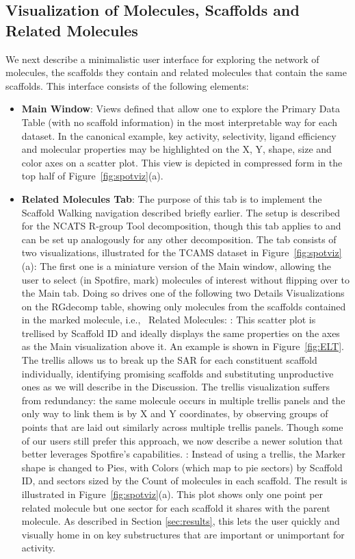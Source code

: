 \documentclass[journal=jacsat,manuscript=article]{achemso}
\newcommand*\fref[1]{Figure~\ref{fig:#1}}
\newcommand*\ie{i.e.,~}
\begin{document}
\subsection{Visualization of Molecules, Scaffolds and Related Molecules}

We next describe a minimalistic user interface for exploring the
network of molecules, the scaffolds they contain and related molecules
that contain the same scaffolds. This interface consists of the
following elements:
\begin{itemize}
\item {\bf Main Window}: Views defined that allow one to explore the
  Primary Data Table (with no scaffold information) in the most interpretable
  way for each dataset.  In the canonical example, key activity,
  selectivity, ligand efficiency and molecular properties may be
  highlighted on the X, Y, shape, size and color axes on a scatter  plot.
  This view is depicted in compressed form in the top half of \fref{spotviz}(a).
\item {\bf Related Molecules Tab}: The purpose of this tab is to
  implement the Scaffold Walking navigation described briefly earlier.
  The setup is described for the NCATS R-group Tool decomposition,
  though this tab applies to and can be set up analogously for any
  other decomposition. The tab consists of two visualizations,
  illustrated for the TCAMS dataset in \fref{spotviz}(a): \subitem The
  first one is a miniature version of the Main window, allowing the
  user to select (in Spotfire, mark) molecules of interest without
  flipping over to the Main tab. Doing so drives one of the following
  two Details Visualizations on the {RG}decomp table, showing only
  molecules from the scaffolds contained in the marked molecule, \ie
  Related Molecules: : This scatter
  plot is trellised by Scaffold ID and ideally displays the same
  properties on the axes as the Main visualization above it.  An
  example is shown in \fref{ELT}. The trellis allows us to break up
  the SAR for each constituent scaffold individually, identifying
  promising scaffolds and substituting unproductive ones as we will
  describe in the Discussion. The trellis visualization suffers from
  redundancy: the same molecule occurs in multiple trellis panels and
  the only way to link them is by X and Y coordinates, by observing
  groups of points that are laid out similarly across multiple trellis
  panels.  Though some of our users still prefer this approach, we now
  describe a newer solution that better leverages Spotfire's
  capabilities.  : Instead of using a
  trellis, the Marker shape is changed to Pies, with Colors (which map
  to pie sectors) by Scaffold ID, and sectors sized by the Count of
  molecules in each scaffold.  The result is illustrated in
  \fref{spotviz}(a). This plot shows only one point per related
  molecule but one sector for each scaffold it shares with the parent
  molecule.  As described in Section \ref{sec:results}, this lets the
  user quickly and visually home in on key substructures that are
  important or unimportant for activity.


\end{itemize}
\end{document}
